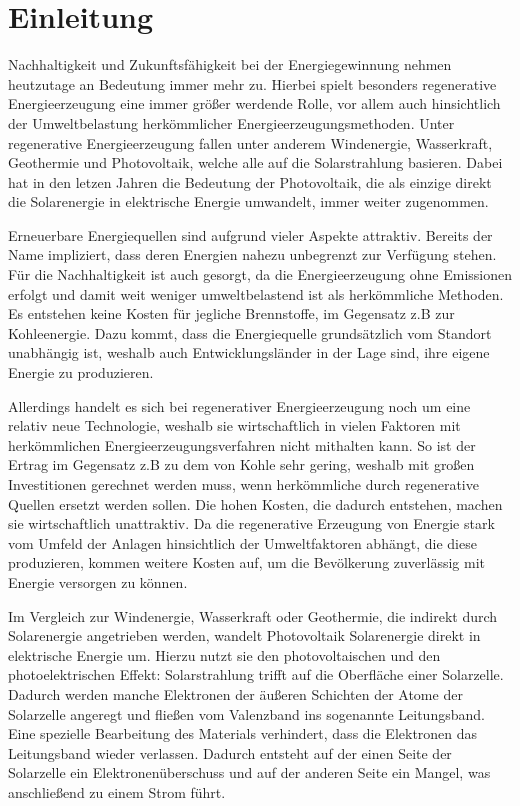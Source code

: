 \documentclass{etit-workshop-protokoll}
\begin{document}
\section{Einleitung}
    \par Nachhaltigkeit und Zukunftsfähigkeit bei der Energiegewinnung nehmen heutzutage an Bedeutung immer mehr zu. Hierbei spielt besonders regenerative Energieerzeugung eine immer größer werdende Rolle, vor allem auch hinsichtlich der Umweltbelastung herkömmlicher Energieerzeugungsmethoden. Unter regenerative Energieerzeugung fallen unter anderem Windenergie, Wasserkraft, Geothermie und Photovoltaik, welche alle auf die Solarstrahlung basieren. Dabei hat in den letzen Jahren die Bedeutung der Photovoltaik, die als einzige direkt die Solarenergie in elektrische Energie umwandelt, immer weiter zugenommen.
    \par Erneuerbare Energiequellen sind aufgrund vieler Aspekte attraktiv. Bereits der Name impliziert, dass deren Energien nahezu unbegrenzt zur Verfügung stehen. Für die Nachhaltigkeit ist auch gesorgt, da die Energieerzeugung ohne Emissionen erfolgt und damit weit weniger umweltbelastend ist als herkömmliche Methoden. Es entstehen keine Kosten für jegliche Brennstoffe, im Gegensatz z.B zur Kohleenergie. Dazu kommt, dass die Energiequelle grundsätzlich vom Standort unabhängig ist, weshalb auch Entwicklungsländer in der Lage sind, ihre eigene Energie zu produzieren.
    \par Allerdings handelt es sich bei regenerativer Energieerzeugung noch um eine relativ neue Technologie, weshalb sie wirtschaftlich in vielen Faktoren mit herkömmlichen Energieerzeugungsverfahren nicht mithalten kann. So ist der Ertrag im Gegensatz z.B zu dem von Kohle sehr gering, weshalb mit großen Investitionen gerechnet werden muss, wenn herkömmliche durch regenerative Quellen ersetzt werden sollen. Die hohen Kosten, die dadurch entstehen, machen sie wirtschaftlich unattraktiv. Da die regenerative Erzeugung von Energie stark vom Umfeld der Anlagen hinsichtlich der Umweltfaktoren abhängt, die diese produzieren, kommen weitere Kosten auf, um die Bevölkerung zuverlässig mit Energie versorgen zu können.
    \par Im Vergleich zur Windenergie, Wasserkraft oder Geothermie, die indirekt durch Solarenergie angetrieben werden, wandelt Photovoltaik Solarenergie direkt in elektrische Energie um. Hierzu nutzt sie den photovoltaischen und den photoelektrischen Effekt: Solarstrahlung trifft auf die Oberfläche einer Solarzelle. Dadurch werden manche Elektronen der äußeren Schichten der Atome der Solarzelle angeregt und fließen vom Valenzband ins sogenannte Leitungsband. Eine spezielle Bearbeitung des Materials verhindert, dass die Elektronen das Leitungsband wieder verlassen. Dadurch entsteht auf der einen Seite der Solarzelle ein Elektronenüberschuss und auf der anderen Seite ein Mangel, was anschließend zu einem Strom führt.
\end{document}
